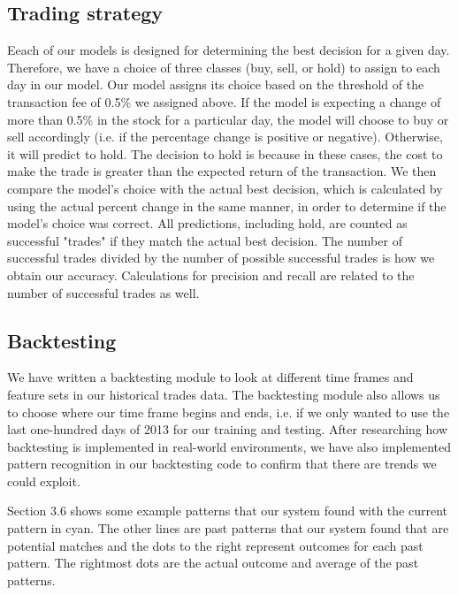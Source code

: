 \documentclass{article}
\begin{document}
\subsection{Trading strategy}
Eeach of our models is designed for determining the best decision for a given day. Therefore, we have a choice of three classes (buy, sell, or hold) to assign to each day in our model. Our model assigns its choice based on the threshold of the transaction fee of 0.5\% we assigned above. If the model is expecting a change of more than 0.5\% in the stock for a particular day, the model will choose to buy or sell accordingly (i.e. if the percentage change is positive or negative). Otherwise, it will predict to hold. The decision to hold is because in these cases, the cost to make the trade is greater than the expected return of the transaction. We then compare the model's choice with the actual best decision, which is calculated by using the actual percent change in the same manner, in order to determine if the model's choice was correct. All predictions, including hold, are counted as successful "trades" if they match the actual best decision. The number of successful trades divided by the number of possible successful trades is how we obtain our accuracy. Calculations for precision and recall are related to the number of successful trades as well.

\subsection{Backtesting}
We have written a backtesting module to look at different time frames and feature sets in our historical trades data. The backtesting module also allows us to choose where our time frame begins and ends, i.e. if we only wanted to use the last one-hundred days of 2013 for our training and testing. After researching how backtesting is implemented in real-world environments, we have also implemented pattern recognition in our backtesting code to confirm that there are trends we could exploit.

Section 3.6 shows some example patterns that our system found with the current pattern in cyan. The other lines are past patterns that our system found that are potential matches and the dots to the right represent outcomes for each past pattern.  The rightmost dots are the actual outcome and average of the past patterns.
\end{document}
